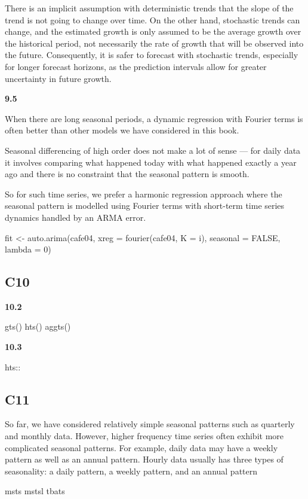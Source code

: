 \documentclass[]{book}
\begin{document}
There is an implicit assumption with deterministic trends that the slope
of the trend is not going to change over time. On the other hand,
stochastic trends can change, and the estimated growth is only assumed
to be the average growth over the historical period, not necessarily the
rate of growth that will be observed into the future. Consequently, it
is safer to forecast with stochastic trends, especially for longer
forecast horizons, as the prediction intervals allow for greater
uncertainty in future growth.

\textbf{9.5}

When there are long seasonal periods, a dynamic regression with Fourier
terms is often better than other models we have considered in this book.

Seasonal differencing of high order does not make a lot of sense --- for
daily data it involves comparing what happened today with what happened
exactly a year ago and there is no constraint that the seasonal pattern
is smooth.

So for such time series, we prefer a harmonic regression approach where
the seasonal pattern is modelled using Fourier terms with short-term
time series dynamics handled by an ARMA error.

fit \textless{}- auto.arima(cafe04, xreg = fourier(cafe04, K = i),
seasonal = FALSE, lambda = 0)

\subsection{C10}\label{c10}

\textbf{10.2}

gts() \textbar{} hts() \textbar{} aggts()

\textbf{10.3}

hts::

\subsection{C11}\label{c11}

So far, we have considered relatively simple seasonal patterns such as
quarterly and monthly data. However, higher frequency time series often
exhibit more complicated seasonal patterns. For example, daily data may
have a weekly pattern as well as an annual pattern. Hourly data usually
has three types of seasonality: a daily pattern, a weekly pattern, and
an annual pattern

msts \textbar{} mstsl \textbar{} tbats \textbar{}
\end{document}
